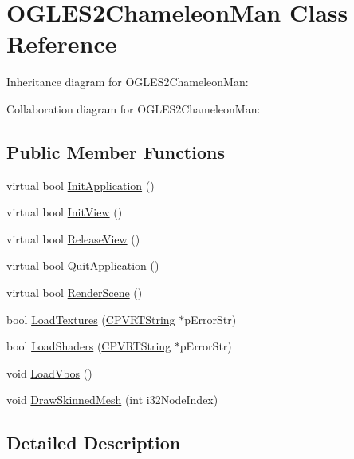 \hypertarget{class_o_g_l_e_s2_chameleon_man}{\section{O\+G\+L\+E\+S2\+Chameleon\+Man Class Reference}
\label{class_o_g_l_e_s2_chameleon_man}
}


Inheritance diagram for O\+G\+L\+E\+S2\+Chameleon\+Man\+:


Collaboration diagram for O\+G\+L\+E\+S2\+Chameleon\+Man\+:
\subsection*{Public Member Functions}
\begin{DoxyCompactItemize}
\item 
virtual bool \hyperlink{class_o_g_l_e_s2_chameleon_man_a8e59a9f71cfb34eea4a3aa4a892c42de}{Init\+Application} ()
\item 
virtual bool \hyperlink{class_o_g_l_e_s2_chameleon_man_aff0a432d1cfdf96f597d589638722c0e}{Init\+View} ()
\item 
virtual bool \hyperlink{class_o_g_l_e_s2_chameleon_man_a542ad30ebd7658c23e573193f6e34539}{Release\+View} ()
\item 
virtual bool \hyperlink{class_o_g_l_e_s2_chameleon_man_a977ebc542d791f3dbd865834a1d0c59f}{Quit\+Application} ()
\item 
virtual bool \hyperlink{class_o_g_l_e_s2_chameleon_man_a4e2c16c18f3f2292ac404284ba3defb8}{Render\+Scene} ()
\item 
bool \hyperlink{class_o_g_l_e_s2_chameleon_man_ae9d5bad2b3382b59cb57209555d59e32}{Load\+Textures} (\hyperlink{class_c_p_v_r_t_string}{C\+P\+V\+R\+T\+String} $\ast$p\+Error\+Str)
\item 
bool \hyperlink{class_o_g_l_e_s2_chameleon_man_acaebc61e0b7b063182cc2fe17828c9cd}{Load\+Shaders} (\hyperlink{class_c_p_v_r_t_string}{C\+P\+V\+R\+T\+String} $\ast$p\+Error\+Str)
\item 
void \hyperlink{class_o_g_l_e_s2_chameleon_man_abe3e79168b3e518004b23ae32178f3f2}{Load\+Vbos} ()
\item 
void \hyperlink{class_o_g_l_e_s2_chameleon_man_a522a000e30d6aefecab1774eed618b77}{Draw\+Skinned\+Mesh} (int i32\+Node\+Index)
\end{DoxyCompactItemize}


\subsection{Detailed Description}


